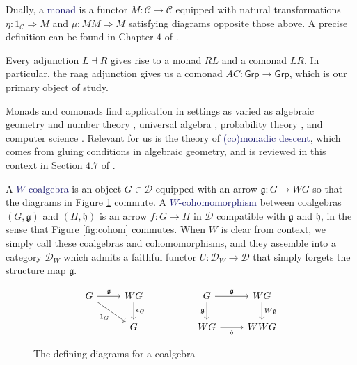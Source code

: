\documentclass[12pt]{article}
\theoremstyle{definition}
\theoremstyle{theorem}
\newcommand*{\catFont}[1]{\mathsf{#1}}
\newcommand*{\catVarFont}[1]{\mathcal{#1}}
\newcommand{\Grp}{\catFont{Grp}}
\newcommand{\catC}{\catVarFont{C}}
\newcommand{\catD}{\catVarFont{D}}
\newcommand*{\important}[1]{\textcolor{MidnightBlue}{#1}}
\begin{document}
Dually, a \important{monad} is a functor $M : \catC \to \catC$ equipped with 
natural transformations $\eta : 1_\catC \Rightarrow M$ and 
$\mu : MM \Rightarrow M$ satisfying diagrams opposite those above. A precise
definition can be found in Chapter $4$ of \cite{borceuxCategoriesStructures1994}.

Every adjunction $L \dashv R$ gives rise to a monad $RL$ and a comonad 
$LR$. In particular, the raag adjunction gives us a comonad 
$AC : \Grp \to \Grp$, which is our primary object of study.

Monads and comonads find application in settings as varied as algebraic 
geometry and number theory
\cite{grothendieckTechniqueDescenteTheoremes1958, 
borceuxCategoriesStructures1994,
borceuxMonadicApproachGalois2010},
universal algebra 
\cite{borceuxCategoriesStructures1994,
adamekAlgebraicTheoriesCategorical2011,
bojanczykRecognisableLanguagesMonads2015,
awodeyCoalgebraicDualBirkhoff2000,
hylandCategoryTheoreticUnderstanding2007},
probability theory 
\cite{giryCategoricalApproachProbability1982,
culbertsonCategoricalFoundationBayesian2014,
leinsterCODENSITYULTRAFILTERMONAD2013},
and computer science 
\cite{moggiNotionsComputationMonads1991,
depaivaDialecticaComonads2021,
ghaniAlgebrasCoalgebrasMonads2001,
ruttenUniversalCoalgebraTheory2000}.
Relevant for us is the theory of \important{(co)monadic descent}, 
which comes from gluing conditions in algebraic geometry, 
and is reviewed in this context in Section $4.7$ of 
\cite{borceuxCategoriesStructures1994}.

A \important{$W$-coalgebra} is an object
$G \in \catD$ equipped with an arrow $\mathfrak{g} : G \to WG$ so that the
diagrams in Figure \ref{fig:coalg} commute. A \important{$W$-cohomomorphism}
between coalgebras $(G,\mathfrak{g})$ and $(H,\mathfrak{h})$ is an arrow $f : G \to H$
in $\mathcal{D}$ compatible with $\mathfrak{g}$ and $\mathfrak{h}$, in the sense that 
Figure \ref{fig:cohom} commutes. When $W$ is clear from context, we simply call these
coalgebras and cohomomorphisms, and they assemble into a category $\catD_W$
which admits a faithful functor $U : \catD_W \to \catD$ that 
simply forgets the structure map $\mathfrak{g}$.

\begin{figure}
    \[
        \begin{tikzcd}
        G & WG && G & WG \\
        & G && WG & WWG
        \arrow["\mathfrak{g}", from=1-1, to=1-2]
        \arrow["{\epsilon_G}", from=1-2, to=2-2]
        \arrow["{1_G}"', from=1-1, to=2-2]
        \arrow["\mathfrak{g}"', from=1-4, to=2-4]
        \arrow["\mathfrak{g}", from=1-4, to=1-5]
        \arrow["\delta"', from=2-4, to=2-5]
        \arrow["W\mathfrak{g}", from=1-5, to=2-5]
        \end{tikzcd}
    \]
    \caption{The defining diagrams for a coalgebra}
    \label{fig:coalg}
\end{figure}
\end{document}
